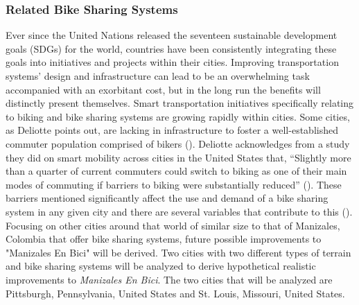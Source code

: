 \documentclass[12pt]{article}
\begin{document}
\subsubsection*{Related Bike Sharing Systems}
Ever since the United Nations released the seventeen sustainable development goals (SDGs) for the world, countries have been consistently integrating these goals into initiatives and projects within their cities. Improving transportation systems’ design and infrastructure can lead to be an overwhelming task accompanied with an exorbitant cost, but in the long run the benefits will distinctly present themselves. Smart transportation initiatives specifically relating to biking and bike sharing systems are growing rapidly within cities. Some cities, as Deliotte points out, are lacking in infrastructure to foster a well-established commuter population comprised of bikers (\cite{DeliotteReport}). Deliotte acknowledges from a study they did on smart mobility across cities in the United States that, “Slightly more than a quarter of current commuters could switch to biking as one of their main modes of commuting if barriers 
to biking were substantially reduced” (\cite{DeliotteReport}).
These barriers mentioned significantly affect the use and demand of a bike sharing system in any given city and 
there are several variables that contribute to this (\cite{ReviewonBike-sharing}). Focusing on other cities around that world of similar size to that of Manizales, Colombia that offer bike sharing systems, future possible improvements to "Manizales En Bici" will be derived. Two cities with two different types of terrain and bike sharing systems will be analyzed to derive hypothetical realistic improvements to \textit{Manizales En Bici}. The two cities that will be analyzed are Pittsburgh, Pennsylvania, United States and St. Louis, Missouri, United States. 
\end{document}
